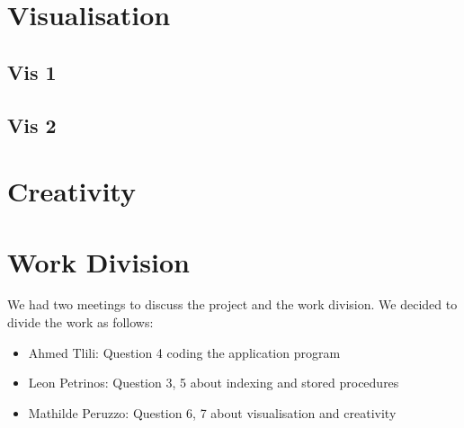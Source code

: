 \documentclass[a4paper,11pt]{article}
\begin{document}
\section*{Visualisation}

\subsection*{Vis 1}

\subsection*{Vis 2}

\section*{Creativity}

\section*{Work Division}
We had two meetings to discuss the project and the work division. We decided to divide the work as follows:
\begin{itemize}
    \item Ahmed Tlili: Question 4 coding the application program
    \item Leon Petrinos: Question 3, 5 about indexing and stored procedures
    \item Mathilde Peruzzo: Question 6, 7 about visualisation and creativity
\end{itemize}
\end{document}

